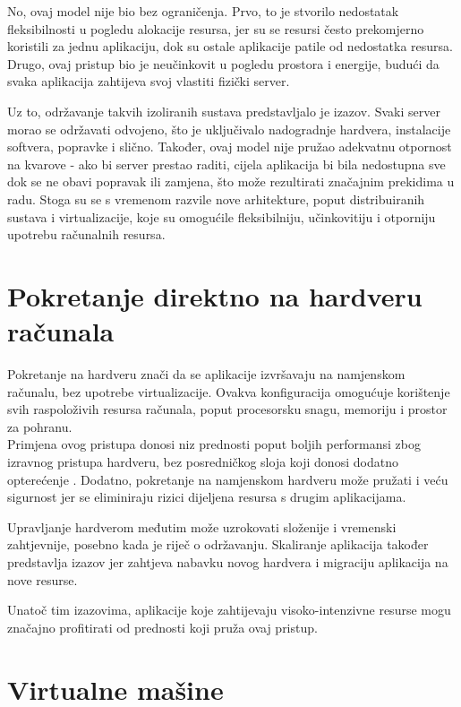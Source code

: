 \documentclass[times, utf8, diplomski]{fer}
\begin{document}
No, ovaj model nije bio bez ograničenja. Prvo, to je stvorilo nedostatak fleksibilnosti u pogledu alokacije resursa, jer su se resursi često prekomjerno koristili za jednu aplikaciju, dok su ostale aplikacije patile od nedostatka resursa. Drugo, ovaj pristup bio je neučinkovit u pogledu prostora i energije, budući da svaka aplikacija zahtijeva svoj vlastiti fizički server.

Uz to, održavanje takvih izoliranih sustava predstavljalo je izazov. Svaki server morao se održavati odvojeno, što je uključivalo nadogradnje hardvera, instalacije softvera, popravke i slično. Također, ovaj model nije pružao adekvatnu otpornost na kvarove - ako bi server prestao raditi, cijela aplikacija bi bila nedostupna sve dok se ne obavi popravak ili zamjena, što može rezultirati značajnim prekidima u radu.
Stoga su se s vremenom razvile nove arhitekture, poput distribuiranih sustava i virtualizacije, koje su omogućile fleksibilniju, učinkovitiju i otporniju upotrebu računalnih resursa.

\section{Pokretanje direktno na hardveru računala}

Pokretanje na hardveru  znači da se aplikacije izvršavaju na namjenskom računalu, bez upotrebe virtualizacije. Ovakva konfiguracija omogućuje korištenje svih raspoloživih resursa računala, poput procesorsku snagu, memoriju i prostor za pohranu. \\

Primjena ovog pristupa donosi niz prednosti poput boljih performansi zbog izravnog pristupa hardveru, bez posredničkog sloja koji donosi dodatno opterećenje . Dodatno, pokretanje na namjenskom hardveru može pružati i veću sigurnost jer se eliminiraju rizici dijeljena resursa s drugim aplikacijama.

Upravljanje hardverom međutim može uzrokovati složenije i vremenski zahtjevnije, posebno kada je riječ o održavanju. Skaliranje aplikacija također predstavlja izazov jer zahtjeva nabavku novog hardvera i migraciju aplikacija na nove resurse.

Unatoč tim izazovima, aplikacije koje zahtijevaju visoko-intenzivne resurse mogu značajno profitirati od prednosti koji pruža ovaj pristup.


\section{Virtualne mašine}
\end{document}
